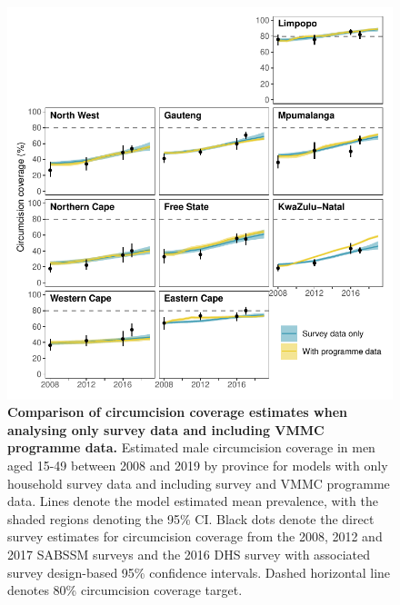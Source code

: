\documentclass{article}
\begin{document}
\begin{figure}[H]
  \centering
  \includegraphics[width = 5.2in]{Figures/paper/Figure7.pdf}
  \caption{{\bf Comparison of circumcision coverage estimates when analysing only survey data and including VMMC programme data.} Estimated male circumcision coverage in men aged 15-49 between 2008 and 2019 by province for models with only household survey data and including survey and VMMC programme data. Lines denote the model estimated mean prevalence, with the shaded regions denoting the 95\% CI. Black dots denote the direct survey estimates for circumcision coverage from the 2008, 2012 and 2017 SABSSM surveys and the 2016 DHS survey with associated survey design-based 95\% confidence intervals. Dashed horizontal line denotes 80\% circumcision coverage target.}
  \label{fig::comparison}
\end{figure}



\end{document}
